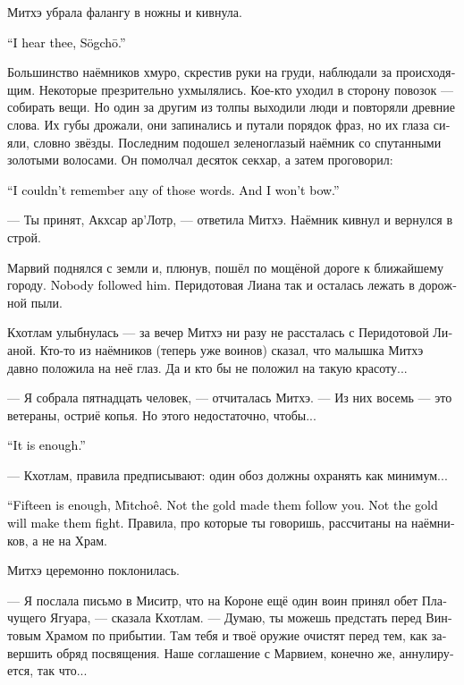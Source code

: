 \documentclass[a4paper,12pt,fleqn]{book}\usepackage{cooltooltips}\usepackage{polyglossia}\setdefaultlanguage{russian}\setotherlanguage{english}\defaultfontfeatures{Ligatures=TeX,Mapping=tex-text} \usepackage{xcolor}\definecolor{lightgray}{HTML}{bbbbbb}\color{lightgray}\newcommand{\ml}[3]{\textenglish{\textcolor{black}{#3}}}
\newcommand{\asterism}{\vspace{1em}{\centering\Large\bfseries$\ast~\ast~\ast$\par}\vspace{1em}}
\newcommand{\Mitchoe}{M\={\i}tcho\^{e}}
\newcommand{\Sogcho}{S\"{o}gch\={o}}
\begin{document}
Митхэ убрала фалангу в ножны и кивнула.

\ml{$0$}
{--- Я тебя слушаю, Согхо.}
{``I hear thee, \Sogcho.''}

Большинство наёмников хмуро, скрестив руки на груди, наблюдали за происходящим.
Некоторые презрительно ухмылялись.
Кое-кто уходил в сторону повозок --- собирать вещи.
Но один за другим из толпы выходили люди и повторяли древние слова.
Их губы дрожали, они запинались и путали порядок фраз, но их глаза сияли, словно звёзды.
Последним подошел зеленоглазый наёмник со спутанными золотыми волосами.
Он помолчал десяток секхар, а затем проговорил:

\ml{$0$}
{--- Я не запомнил ни слова из клятвы.}
{``I couldn't remember any of those words.}
\ml{$0$}
{И кланяться не хочу.}
{And I won't bow.''}

--- Ты принят, Акхсар ар'Лотр, --- ответила Митхэ.
Наёмник кивнул и вернулся в строй.

Марвий поднялся с земли и, плюнув, пошёл по мощёной дороге к ближайшему городу.
\ml{$0$}
{За ним не последовал никто.}
{Nobody followed him.}
Перидотовая Лиана так и осталась лежать в дорожной пыли.

\asterism

Кхотлам улыбнулась --- за вечер Митхэ ни разу не рассталась с Перидотовой Лианой.
Кто-то из наёмников (теперь уже воинов) сказал, что малышка Митхэ давно положила на неё глаз.
Да и кто бы не положил на такую красоту...

--- Я собрала пятнадцать человек, --- отчиталась Митхэ.
--- Из них восемь --- это ветераны, остриё копья.
Но этого недостаточно, чтобы...

\ml{$0$}
{--- Достаточно.}
{``It is enough.''}

--- Кхотлам, правила предписывают: один обоз должны охранять как минимум...

\ml{$0$}
{--- Пятнадцати достаточно, Митхэ.}
{``Fifteen is enough, \Mitchoe.}
\ml{$0$}
{Они пошли за тобой не ради золота.}
{Not the gold made them follow you.}
\ml{$0$}
{А значит, и сражаться будут не ради золота.}
{Not the gold will make them fight.}
Правила, про которые ты говоришь, рассчитаны на наёмников, а не на Храм.

Митхэ церемонно поклонилась.

--- Я послала письмо в Миситр, что на Короне ещё один воин принял обет Плачущего Ягуара, --- сказала Кхотлам.
--- Думаю, ты можешь предстать перед Винтовым Храмом по прибытии.
Там тебя и твоё оружие очистят перед тем, как завершить обряд посвящения.
Наше соглашение с Марвием, конечно же, аннулируется, так что...
\end{document}
